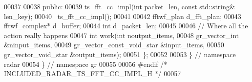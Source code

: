 \begin{DoxyCode}
00037 
00038      \textcolor{keyword}{public}:
00039       ts_fft_cc_impl(\textcolor{keywordtype}{int} packet\_len, \textcolor{keyword}{const} std::string& len\_key);
00040       ~ts_fft_cc_impl();
00041 
00042       fftwf\_plan d_fft_plan;
00043       fftwf\_complex* d_buffer;
00044       \textcolor{keywordtype}{int} d_packet_len;
00045 
00046       \textcolor{comment}{// Where all the action really happens}
00047       \textcolor{keywordtype}{int} work(\textcolor{keywordtype}{int} noutput\_items,
00048                gr\_vector\_int &ninput\_items,
00049                gr\_vector\_const\_void\_star &input\_items,
00050                gr\_vector\_void\_star &output\_items);
00051     \};
00052 
00053   \} \textcolor{comment}{// namespace radar}
00054 \} \textcolor{comment}{// namespace gr}
00055 
00056 \textcolor{preprocessor}{#endif }\textcolor{comment}{/* INCLUDED\_RADAR\_TS\_FFT\_CC\_IMPL\_H */}\textcolor{preprocessor}{}
00057 
\end{DoxyCode}
